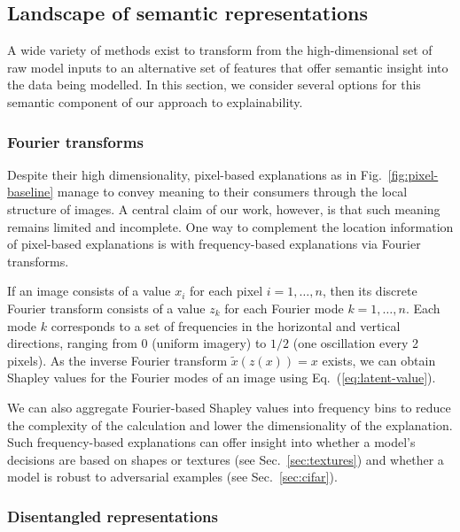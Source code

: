 \documentclass{article}
\DeclareRobustCommand{\Sec}[1]{Sec.~\ref{sec:#1}}
\DeclareRobustCommand{\Fig}[1]{Fig.~\ref{fig:#1}}
\DeclareRobustCommand{\Eq}[1]{Eq.~(\ref{eq:#1})}
\begin{document}
\subsection{Landscape of semantic representations}
\label{sec:semantic-reps}


A wide variety of methods exist to transform from the high-dimensional set of raw model inputs to an alternative set of features that offer semantic insight into the data being modelled. In this section, we consider several options for this semantic component of our approach to explainability.


\subsubsection{Fourier transforms}
\label{sec:fourier}


Despite their high dimensionality, pixel-based explanations as in \Fig{pixel-baseline} manage to convey meaning to their consumers through the local structure of images. A central claim of our work, however, is that such meaning remains limited and incomplete. One way to complement the location information of pixel-based explanations is with frequency-based explanations via Fourier transforms.

If an image consists of a value $x_i$ for each pixel $i = 1, \ldots, n$, then its discrete Fourier transform \citep{fft} consists of a value $z_k$ for each Fourier mode $k = 1, \ldots, n$. Each mode $k$ corresponds to a set of frequencies in the horizontal and vertical directions, ranging from 0 (uniform imagery) to $1/2$ (one oscillation every 2 pixels). As the inverse Fourier transform $\tilde x(z(x)) = x$ exists, we can obtain Shapley values for the Fourier modes of an image using \Eq{latent-value}. 

We can also aggregate Fourier-based Shapley values into frequency bins to reduce the complexity of the calculation and lower the dimensionality of the explanation. Such frequency-based explanations can offer insight into whether a model's decisions are based on shapes or textures (see \Sec{textures}) and whether a model is robust to adversarial examples (see \Sec{cifar}).


\subsubsection{Disentangled representations}
\label{sec:disentanglement}
\end{document}
